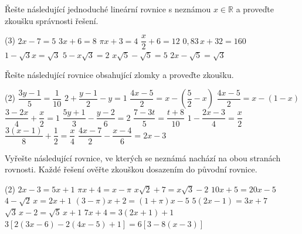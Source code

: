 \documentclass[12pt,a4paper]{article}
\begin{document}

\exercisepart
\setcounter{section}{1} %


\begin{exercise}
  Řešte následující jednoduché lineární rovnice s neznámou \(x \in \mathbb{R}\) a proveďte zkoušku správnosti řešení.
  \begin{tasks}(3)
    \task $2x - 7 = 5$
    \task $3x + 6 = 8$
    \task $\pi x + 3= 4$
    \task \(\dfrac{x}{2} + 6 = 12\)
    \task \(0{,}83\,x + 32 = 160\)
    \task $1-\sqrt{3}x=\sqrt{3}$
    \task \(5 - x\sqrt{3} = 2\)
    \task \(x\sqrt{5} - \sqrt{5} = 5\)
    \task $2x - \sqrt{5} = \sqrt{3}$
  \end{tasks}
\end{exercise}


\begin{exercise}
  Řešte následující rovnice obsahující zlomky a proveďte zkoušku.
  \begin{tasks}(2)
    \task \(\dfrac{3y - 1}{5} = \dfrac{1}{10}\)
    \task \(2 + \dfrac{y - 1}{2} - y = 1\)
    \task \(\dfrac{4x - 5}{2} = x - \left(\dfrac{5}{2} - x\right)\)
    \task \(\dfrac{4x - 5}{2} = x - (1 - x)\)
    \task \(\dfrac{3 - 2x}{4} + \dfrac{x}{2} = 1\)
    \task \(\dfrac{5y + 1}{3} - \dfrac{y - 2}{6} = 2\)
    \task \(\dfrac{7 - 3t}{5} = \dfrac{t + 8}{10}\)
    \task \(1 - \dfrac{2x - 3}{4} = \dfrac{x}{2}\)
    \task \(\dfrac{3(x - 1)}{8} + \dfrac{1}{2} = \dfrac{x}{4}\)
    \task $\dfrac{4x - 7}{2} - \dfrac{x - 4}{6} = 2x - 3 $
  \end{tasks}
\end{exercise}


\begin{exercise}
  Vyřešte následující rovnice, ve kterých se neznámá nachází na obou stranách rovnosti.  
  Každé řešení ověřte zkouškou dosazením do původní rovnice.
  \begin{tasks}(2)
    \task \(2x - 3 = 5x + 1\)
    \task \(\pi x + 4 = x - \pi\)
    \task \(x\sqrt{2} + 7 = x\sqrt{3} - 2\)
    \task \(10x + 5 = 20x - 5\)
    \task \(4 - \sqrt{2}\,x = 2x + 1\)
    \task \((3 - \pi)x + 2 = (1 + \pi)x - 5\)
    \task \(5(2x - 1) = 3x + 7\)
    \task \(\sqrt{3}\,x - 2 = \sqrt{5}\,x + 1\)
    \task \(7x + 4 = 3(2x + 1) + 1\)
    \task* \(3[2(3x - 6) - 2(4x - 5) + 1] = 6[3 - 8(x - 3)]\)
  \end{tasks}
\end{exercise}
\end{document}

